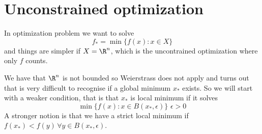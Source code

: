 \chapter{Unconstrained optimization}
In optimization problem we want to solve 
\[ f_* = \min \{ f(x) : x \in X\} \]
and things are simpler if $X = \R^n$, which is the uncontrained optimization where only $f$ counts.

We have that $\R^n$ is not bounded so Weierstrass does not apply and turns out that is 
very difficult to recognise if a global minimum $x_*$ exists.\newline
So we will start with a weaker condition, that is that $x_*$ is local minimum if it solves
\[ \min \{f(x): x \in B(x_*, \epsilon)\} \,\, \epsilon > 0 \]
A stronger notion is that we have a strict local minimum if 
$f(x_*) < f(y) \, \forall y \in B(x_*, \epsilon)$.

